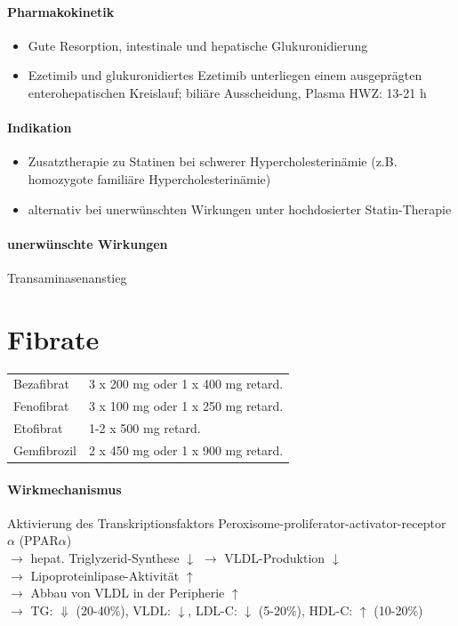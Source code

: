 \documentclass[10pt,a4paper]{report}
\begin{document}
\paragraph{Pharmakokinetik} %
\label{par:pharmakokinetik}
\begin{itemize}
	\item  Gute Resorption, intestinale und hepatische Glukuronidierung
	\item Ezetimib und glukuronidiertes Ezetimib unterliegen einem ausgeprägten enterohepatischen Kreislauf; biliäre Ausscheidung, Plasma HWZ: 13-21 h
\end{itemize}
\paragraph{Indikation} %
\label{par:indikation}
\begin{itemize}
	\item Zusatztherapie zu Statinen bei schwerer Hypercholesterinämie (z.B. homozygote familiäre Hypercholesterinämie)
	\item alternativ bei unerwünschten Wirkungen unter hochdosierter Statin-Therapie
\end{itemize}
\paragraph{unerwünschte Wirkungen} %
\label{par:unerw_nschte_wirkungen}
Transaminasenanstieg
\section{Fibrate} %
\label{sec:fibrate}
\begin{tabularx}{\textwidth}{XX}
Bezafibrat&3 x 200 mg oder 1 x 400 mg retard.\\
Fenofibrat&3 x 100 mg oder 1 x 250 mg retard.\\
Etofibrat&1-2 x 500 mg retard.\\
Gemfibrozil&2 x 450 mg oder 1 x 900 mg retard.\\
\end{tabularx}
\paragraph{Wirkmechanismus} %
\label{par:wirkmechanismus}
Aktivierung des Transkriptionsfaktors 
Peroxisome-proliferator-activator-receptor $\alpha$ (PPAR$\alpha$)\\
$\rightarrow$ hepat. Triglyzerid-Synthese $\downarrow$ $\rightarrow$ VLDL-Produktion $\downarrow$\\
$\rightarrow$ Lipoproteinlipase-Aktivität $\uparrow$ \\
$\rightarrow$ Abbau von VLDL in der Peripherie $\uparrow$\\
$\rightarrow$ TG: $\Downarrow$ (20-40\%), VLDL: $\downarrow$, LDL-C: $\downarrow$ (5-20\%), HDL-C: $\uparrow$ (10-20\%)
\end{document}
